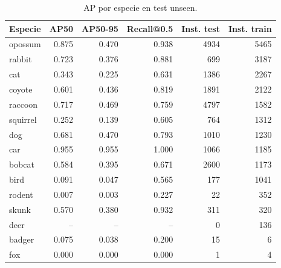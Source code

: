 \begin{table}[ht]
\centering
\small
\begin{tabular}{lrrrrr}
\toprule
Especie & AP50 & AP50-95 & Recall@0.5 & Inst. test & Inst. train \\
\midrule
opossum & 0.875 & 0.470 & 0.938 & 4934 & 5465 \\
rabbit & 0.723 & 0.376 & 0.881 & 699 & 3187 \\
cat & 0.343 & 0.225 & 0.631 & 1386 & 2267 \\
coyote & 0.601 & 0.436 & 0.819 & 1891 & 2122 \\
raccoon & 0.717 & 0.469 & 0.759 & 4797 & 1582 \\
squirrel & 0.252 & 0.139 & 0.605 & 764 & 1312 \\
dog & 0.681 & 0.470 & 0.793 & 1010 & 1230 \\
car & 0.955 & 0.955 & 1.000 & 1066 & 1185 \\
bobcat & 0.584 & 0.395 & 0.671 & 2600 & 1173 \\
bird & 0.091 & 0.047 & 0.565 & 177 & 1041 \\
rodent & 0.007 & 0.003 & 0.227 & 22 & 352 \\
skunk & 0.570 & 0.380 & 0.932 & 311 & 320 \\
deer & -- & -- & -- & 0 & 136 \\
badger & 0.075 & 0.038 & 0.200 & 15 & 6 \\
fox & 0.000 & 0.000 & 0.000 & 1 & 4 \\
\bottomrule
\end{tabular}
\caption{AP por especie en test unseen.}
\label{tab:perclass_test_unseen}
\end{table}
